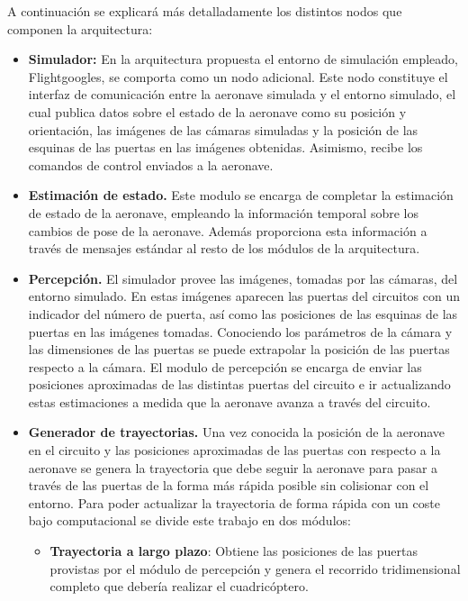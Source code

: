 A continuación se explicará más detalladamente los distintos nodos que componen la arquitectura:
\begin{itemize}
	
	\item \textbf{Simulador:} En la arquitectura propuesta el entorno de simulación empleado, Flightgoogles, se comporta como un nodo adicional. Este nodo constituye el interfaz de comunicación entre la aeronave simulada y el entorno simulado,
	el cual publica datos sobre el estado de la aeronave como su posición y orientación, las imágenes de las cámaras simuladas y la posición de las esquinas de las puertas en las imágenes obtenidas. Asimismo, recibe los comandos de control enviados a la aeronave.
	 
	\item \textbf{Estimación de estado.} Este modulo se encarga de completar la estimación de estado de la aeronave, empleando la información temporal sobre los cambios de pose de la aeronave. Además proporciona esta información a través de mensajes estándar al resto de los módulos de la arquitectura.
	
	\item \textbf{Percepción.} El simulador provee las imágenes, tomadas por las cámaras, del entorno simulado. En estas imágenes aparecen las puertas del circuitos con un indicador del número de puerta, así como las posiciones de las esquinas de las puertas en las imágenes tomadas. Conociendo los parámetros de la cámara y las dimensiones de las puertas se puede extrapolar la posición de las puertas respecto a la cámara. El modulo de percepción se encarga de enviar las posiciones aproximadas de las distintas puertas del circuito e ir actualizando estas estimaciones a medida que la aeronave avanza a través del circuito.
	
	\item \textbf{Generador de trayectorias.} Una vez conocida la posición de la aeronave en el circuito y las posiciones aproximadas de las puertas con respecto a la aeronave se genera la trayectoria que debe seguir la aeronave para pasar a través de las puertas de la forma más rápida posible sin colisionar con el entorno. Para poder actualizar la trayectoria de forma rápida con un coste bajo computacional se divide este trabajo en dos módulos:
	
	\begin{itemize}
		\item \textbf{Trayectoria a largo plazo}: Obtiene las posiciones de las puertas provistas por el módulo de percepción y genera el recorrido tridimensional completo que debería realizar el cuadricóptero. 
		

\end{itemize}
\end{itemize}
